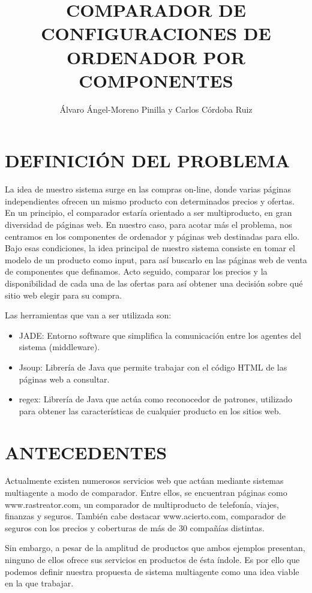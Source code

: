 \documentclass{pre-tfg}
\title{COMPARADOR DE CONFIGURACIONES DE ORDENADOR POR COMPONENTES}
\author{Álvaro Ángel-Moreno Pinilla y Carlos Córdoba Ruiz}
\begin{document}
\maketitle
\tableofcontents

\newpage

\section{DEFINICIÓN DEL PROBLEMA}
La idea de nuestro sistema surge en las compras on-line, donde varias páginas independientes ofrecen un mismo producto con determinados precios y ofertas. En un principio, el comparador estaría orientado a ser multiproducto, en gran diversidad de páginas web. En nuestro caso, para acotar más el problema, nos centramos en los componentes de ordenador y páginas web destinadas para ello. Bajo esas condiciones, la idea principal de nuestro sistema consiste en tomar el modelo de un producto como input, para así buscarlo en las páginas web de venta de componentes que definamos. Acto seguido, comparar los precios y la disponibilidad de cada una de las ofertas para así obtener una decisión sobre qué sitio web elegir para su compra.

Las herramientas que van a ser utilizada son:
	\begin{itemize}
		\item JADE: Entorno software que simplifica la comunicación entre los agentes del sistema (middleware).
		\item Jsoup: Librería de Java que permite trabajar con el código HTML de las páginas web a consultar.
		\item regex: Librería de Java que actúa como reconocedor de patrones, utilizado para obtener las características de cualquier producto en los sitios web.
	\end{itemize}

\section{ANTECEDENTES}
Actualmente existen numerosos servicios web que actúan mediante sistemas multiagente a modo de comparador. Entre ellos, se encuentran páginas como www.rastreator.com, un comparador de multiproducto de telefonía, viajes, finanzas y seguros. También cabe destacar www.acierto.com, comparador de seguros con los precios y coberturas de más de 30 compañías distintas.

Sin embargo, a pesar de la amplitud de productos que ambos ejemplos presentan, ninguno de ellos ofrece sus servicios en productos de ésta índole. Es por ello que podemos definir nuestra propuesta de sistema multiagente como una idea viable en la que trabajar.
\end{document}
